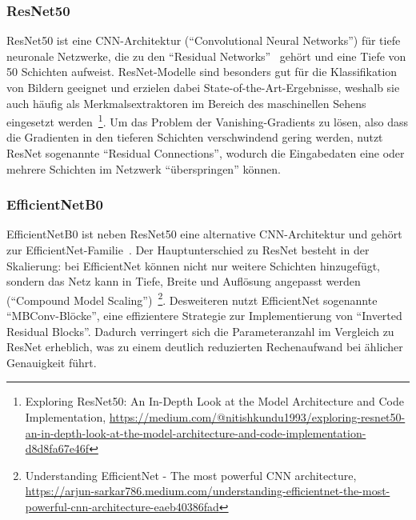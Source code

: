 \documentclass{article}
\newcommand{\resnet}{ResNet50\xspace}
\newcommand{\effnet}{EfficientNetB0\xspace}
\begin{document}
    \subsubsection{\resnet}
    \resnet ist eine CNN-Architektur (\enquote{Convolutional Neural Networks}) für tiefe neuronale Netzwerke, die zu den \enquote{Residual Networks}~\cite{resnet} gehört und eine Tiefe von 50 Schichten aufweist.
    ResNet-Modelle sind besonders gut für die Klassifikation von Bildern geeignet und erzielen dabei State-of-the-Art-Ergebnisse, weshalb sie auch häufig als Merkmalsextraktoren im Bereich des maschinellen Sehens eingesetzt werden~\footnote{Exploring ResNet50: An In-Depth Look at the Model Architecture and Code Implementation, \url{https://medium.com/@nitishkundu1993/exploring-resnet50-an-in-depth-look-at-the-model-architecture-and-code-implementation-d8d8fa67e46f}}.
    Um das Problem der Vanishing-Gradients zu lösen, also dass die Gradienten in den tieferen Schichten verschwindend gering werden, nutzt ResNet sogenannte \enquote{Residual Connections}, wodurch die Eingabedaten eine oder mehrere Schichten im Netzwerk \enquote{überspringen} können.
    \subsubsection{\effnet}
    \effnet ist neben \resnet eine alternative CNN-Architektur und gehört zur EfficientNet-Familie~\cite{efficientnet}.
    Der Hauptunterschied zu ResNet besteht in der Skalierung: bei EfficientNet können nicht nur weitere Schichten hinzugefügt, sondern das Netz kann in Tiefe, Breite und Auflösung angepasst werden (\enquote{Compound Model Scaling})~\footnote{Understanding EfficientNet - The most powerful CNN architecture, \url{https://arjun-sarkar786.medium.com/understanding-efficientnet-the-most-powerful-cnn-architecture-eaeb40386fad}}.
    Desweiteren nutzt EfficientNet sogenannte \enquote{MBConv-Blöcke}, eine effizientere Strategie zur Implementierung von \enquote{Inverted Residual Blocks}.
    Dadurch verringert sich die Parameteranzahl im Vergleich zu ResNet erheblich, was zu einem deutlich reduzierten Rechenaufwand bei ählicher Genauigkeit führt.
\end{document}
